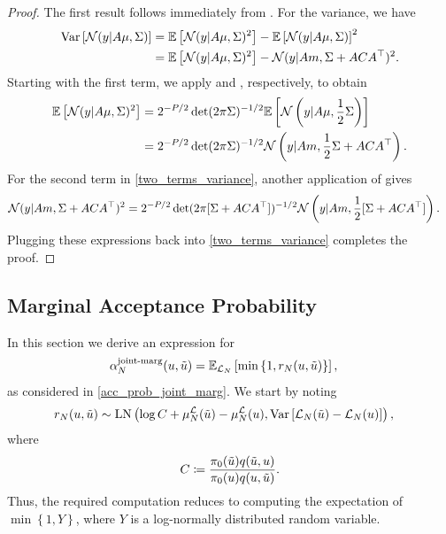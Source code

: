 \documentclass[12pt]{article}
\begin{document}
\begin{proof} 
The first result follows immediately from . For the variance, we have 
\begin{align}
\Var\left[\Gaussian(\obs | A \mu, \likPar) \right] 
&= \E\left[\Gaussian(\obs | A \mu, \likPar)^2 \right] - \E\left[\Gaussian(\obs | A \mu, \likPar) \right]^2 \nonumber \\
&= \E\left[\Gaussian(\obs | A \mu, \likPar)^2 \right] - \Gaussian(\obs | Am, \likPar + ACA^\top)^2. \label{two_terms_variance}
\end{align}
Starting with the first term, we apply  and 
, respectively, to obtain 
\begin{align*}
\E\left[\Gaussian(\obs | A \mu, \likPar)^2 \right]
&= 2^{-\dimObs/2} \det(2\pi \likPar)^{-1/2} \E\left[\Gaussian\left(\obs | A\mu, \frac{1}{2}\likPar \right)\right] \\
&= 2^{-\dimObs/2} \det(2\pi \likPar)^{-1/2} \Gaussian\left(\obs | Am, \frac{1}{2}\likPar + ACA^\top \right).
\end{align*}
For the second term in \ref{two_terms_variance}, another application of  gives
\begin{align*}
\Gaussian(\obs | Am, \likPar + ACA^\top)^2
&= 2^{-\dimObs/2} \det(2\pi[\likPar + ACA^\top])^{-1/2} \Gaussian\left(\obs | Am, \frac{1}{2}[\likPar + ACA^\top]\right).
\end{align*}
Plugging these expressions back into \ref{two_terms_variance} completes the proof. 
\end{proof}


\subsection{Marginal Acceptance Probability}
In this section we derive an expression for 
\begin{align}
\llikEmJointMarg[\Ndesign]{\accProbMH}(\Par, \propPar) 
&= \E_{\llikEm[\Ndesign]} \left[\min\left\{1, \Em[\Ndesign]{\accProbRatio}(\Par, \propPar)\right\} \right], 
\end{align}
as considered in \ref{acc_prob_joint_marg}. We start by noting 
\begin{align}
\Em[\Ndesign]{\accProbRatio}(\Par, \propPar)
&\sim \LN\left(\log C + \emMean[\Ndesign]{\llik}(\propPar) - \emMean[\Ndesign]{\llik}(\Par), \Var\left[\llikEm[\Ndesign](\propPar) - \llikEm[\Ndesign](\Par) \right] \right),
\label{acc_ratio_LN}
\end{align}
where 
\begin{align*}
C \Def \frac{\priorDens(\propPar) \propDens(\propPar, \Par)}{\priorDens(\Par) \propDens(\Par, \propPar)}.
\end{align*}
Thus, the required computation reduces to computing the expectation of $\min\left\{1, Y \right\}$, where $Y$ is a log-normally distributed 
random variable. 
\end{document}
